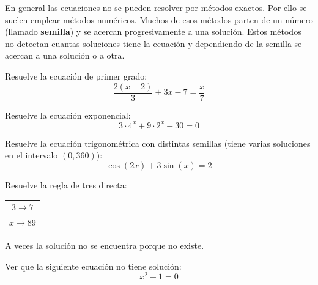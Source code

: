 \documentclass[12pt]{article}
\newenvironment{ejer}{\begin{tcolorbox}[center title, 
fonttitle=\sffamily\bfseries,colback=blue!5,colframe=orange]}{\end{tcolorbox}}
\begin{document}
En general las ecuaciones no se pueden resolver por métodos exactos. Por ello se suelen emplear métodos numéricos. Muchos de esos métodos parten de un número (llamado \textbf{semilla}) y se acercan progresivamente a una solución. Estos métodos no detectan cuantas soluciones tiene la ecuación y dependiendo de la semilla se acercan a una solución o a otra. 

\begin{ejer}


Resuelve la ecuación de primer grado:
\[
\frac{2(x-2)}{3} + 3x-7 = \frac{x}{7}
\]


\end{ejer}

\begin{ejer}

Resuelve la ecuación exponencial:
\[
3\cdot 4^x+9\cdot 2^x-30=0
\]

\end{ejer}

\begin{ejer}

Resuelve la ecuación trigonométrica con distintas semillas (tiene varias soluciones en el intervalo $(0,360)$):
\[
\cos(2x)+3\sin(x) =2
\]



\end{ejer}

\begin{ejer}

Resuelve la regla de tres directa:

\begin{center}
\begin{tabular}{c}
$3 \longrightarrow 7$ \\ 
$x \longrightarrow 89 $\\ 
\end{tabular} 
\end{center}


\end{ejer}

A veces la solución no se encuentra porque no existe.

\begin{ejer}

Ver que la siguiente ecuación no tiene solución:
\[
x^2+1=0
\]

\end{ejer}








\newpage
\end{document}
